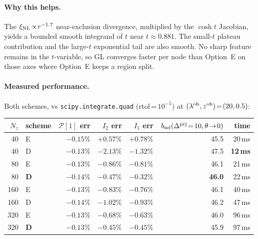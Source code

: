 \documentclass[11pt]{article}
\newcommand{\lob}{\lambda^{\rm ob}}
\newcommand{\zob}{z^{\rm ob}}
\newcommand{\dprj}{\Delta^{\rm prj}}
\newcommand{\xinl}{\xi_{\rm NL}}
\newcommand{\Pop}{\mathcal{P}}
\newcommand{\bsel}{b_{\rm sel}}
\begin{document}
\paragraph{Why this helps.}
The \(\xinl\!\propto\!r^{-1.7}\) near-exclusion divergence,
multiplied by the \(\cosh t\) Jacobian, yields a bounded smooth
integrand of \(t\) near \(t\!\approx\!0.881\). The small-\(t\)
plateau contribution and the large-\(t\) exponential tail are also
smooth. No sharp feature remains in the \(t\)-variable, so GL
converges faster per node than Option~E on those axes where
Option~E keeps a region split.

\paragraph{Measured performance.}
Both schemes, vs \texttt{scipy.integrate.quad} (rtol\,=\,\(10^{-5}\))
at \((\lob,\zob)\!=\!(20,0.5)\):

\vspace{4pt}
\begin{center}
\small
\begin{tabular}{r l r r r r r}
\toprule
\(N_z\) & scheme & \(\Pop[1]\) err & \(I_2\) err & \(I_1\) err
                & \(\bsel(\dprj\!=\!10,\theta\!\to\!0)\) & time \\
\midrule
40  & E & \(-0.15\%\) & \(+0.57\%\) & \(+0.78\%\) & 45.5 & 20\,ms \\
40  & D & \(-0.13\%\) & \(-2.13\%\) & \(-1.32\%\) & 47.5 & \textbf{12\,ms} \\
80  & E & \(-0.13\%\) & \(-0.86\%\) & \(-0.81\%\) & 46.1 & 21\,ms \\
80  & \textbf{D} & \(\mathbf{-0.14\%}\) & \(\mathbf{-0.47\%}\) & \(\mathbf{-0.32\%}\) & \textbf{46.0} & 22\,ms \\
160 & E & \(-0.13\%\) & \(-0.83\%\) & \(-0.76\%\) & 46.1 & 40\,ms \\
160 & D & \(-0.14\%\) & \(-1.02\%\) & \(-0.93\%\) & 46.2 & 47\,ms \\
320 & E & \(-0.13\%\) & \(-0.68\%\) & \(-0.63\%\) & 46.0 & 96\,ms \\
320 & \textbf{D} & \(-0.13\%\) & \(\mathbf{-0.45\%}\) & \(\mathbf{-0.45\%}\) & 45.9 & 97\,ms \\
\bottomrule
\end{tabular}
\end{center}
\end{document}
